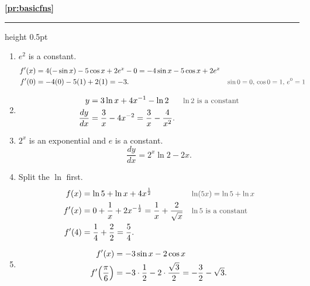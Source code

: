 \documentclass[11pt,a4paper]{article}
\newcounter{basic}
\newcommand{\solitem}[2]{%
 \par\addvspace{16pt}\Needspace{10\baselineskip}%
 {\large\bfseries \ref{#1}}\par\nobreak\vspace{2pt}%
 {\color{rulegray}\hrule height 0.5pt}\nobreak\vspace{7pt}%
 #2\par}
\newcommand{\why}[1]{\text{\small\color{darkgray}#1}}
\begin{document}
\solitem{pr:basicfns}{%
\begin{enumerate}[label=(\alph*)]
 \item $e^2$ is a constant.
 \begin{align*}
 f'(x)&=4(-\sin x)-5\cos x+2e^x-0=-4\sin x-5\cos x+2e^x\\
 f'(0)&=-4(0)-5(1)+2(1)=-3. &&\why{$\sin0=0$, $\cos0=1$, $e^0=1$}
 \end{align*}
 \item
 \begin{align*}
 y&=3\ln x+4x^{-1}-\ln2 &&\why{$\ln2$ is a constant}\\
 \frac{dy}{dx}&=\frac3x-4x^{-2}=\frac3x-\frac{4}{x^2}.
 \end{align*}
 \item $2^x$ is an exponential and $e$ is a constant.
 \[
 \frac{dy}{dx}=2^x\ln2-2x.
 \]
 \item Split the $\ln$ first.
 \begin{align*}
 f(x)&=\ln5+\ln x+4x^{\frac12} &&\why{$\ln(5x)=\ln5+\ln x$}\\
 f'(x)&=0+\frac1x+2x^{-\frac12}=\frac1x+\frac{2}{\sqrt x} &&\why{$\ln5$ is a constant}\\
 f'(4)&=\frac14+\frac22=\frac54.
 \end{align*}
 \item
 \begin{align*}
 f'(x)&=-3\sin x-2\cos x\\
 f'\Bigl(\frac{\pi}{6}\Bigr)&=-3\cdot\frac12-2\cdot\frac{\sqrt3}{2}=-\frac32-\sqrt3.
 \end{align*}
\end{enumerate}
}
\end{document}
